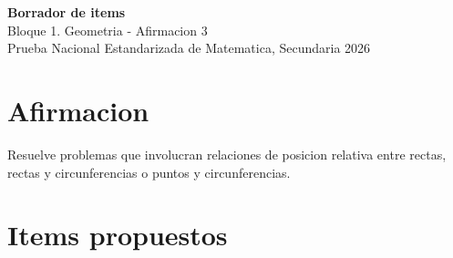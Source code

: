 \documentclass[12pt]{article}
\begin{document}
\begin{center}
  {\Large \textbf{Borrador de items}}\\
  {\large Bloque 1. Geometria - Afirmacion 3}\\[4pt]
  Prueba Nacional Estandarizada de Matematica, Secundaria 2026
\end{center}

\section*{Afirmacion}
Resuelve problemas que involucran relaciones de posicion relativa entre rectas, rectas y circunferencias o puntos y circunferencias.

\section*{Items propuestos}
\end{document}
